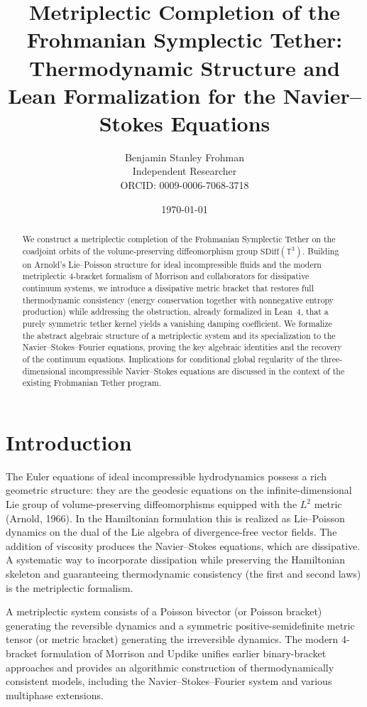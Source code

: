 \documentclass[11pt,a4paper]{article}
\title{\textbf{Metriplectic Completion of the Frohmanian Symplectic Tether:\\
Thermodynamic Structure and Lean Formalization for the Navier--Stokes Equations}}
\author{Benjamin Stanley Frohman\\
Independent Researcher\\
ORCID: 0009-0006-7068-3718}
\date{\today}
\begin{document}
\maketitle

\begin{abstract}
We construct a metriplectic completion of the Frohmanian Symplectic Tether on the coadjoint orbits of the volume-preserving diffeomorphism group \(\mathrm{SDiff}(\mathbb{T}^3)\). Building on Arnold's Lie--Poisson structure for ideal incompressible fluids and the modern metriplectic 4-bracket formalism of Morrison and collaborators for dissipative continuum systems, we introduce a dissipative metric bracket that restores full thermodynamic consistency (energy conservation together with nonnegative entropy production) while addressing the obstruction, already formalized in Lean~4, that a purely symmetric tether kernel yields a vanishing damping coefficient. We formalize the abstract algebraic structure of a metriplectic system and its specialization to the Navier--Stokes--Fourier equations, proving the key algebraic identities and the recovery of the continuum equations. Implications for conditional global regularity of the three-dimensional incompressible Navier--Stokes equations are discussed in the context of the existing Frohmanian Tether program.
\end{abstract}

\tableofcontents

\section{Introduction}
The Euler equations of ideal incompressible hydrodynamics possess a rich geometric structure: they are the geodesic equations on the infinite-dimensional Lie group of volume-preserving diffeomorphisms equipped with the \(L^2\) metric (Arnold, 1966). In the Hamiltonian formulation this is realized as Lie--Poisson dynamics on the dual of the Lie algebra of divergence-free vector fields. The addition of viscosity produces the Navier--Stokes equations, which are dissipative. A systematic way to incorporate dissipation while preserving the Hamiltonian skeleton and guaranteeing thermodynamic consistency (the first and second laws) is the metriplectic formalism.

A metriplectic system consists of a Poisson bivector (or Poisson bracket) generating the reversible dynamics and a symmetric positive-semidefinite metric tensor (or metric bracket) generating the irreversible dynamics. The modern 4-bracket formulation of Morrison and Updike unifies earlier binary-bracket approaches and provides an algorithmic construction of thermodynamically consistent models, including the Navier--Stokes--Fourier system and various multiphase extensions.
\end{document}

